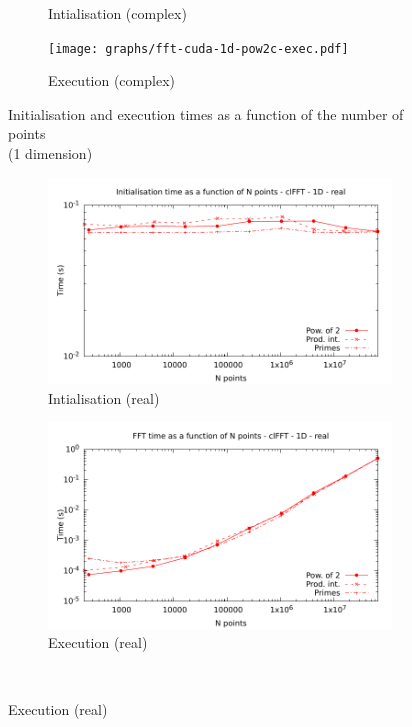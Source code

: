 \documentclass[12pt, a4paper]{article}
\begin{document}
\begin{figure}[H]
\begin{subfigure}{.5\textwidth}
\caption{Intialisation (complex)}
\label{FFTCUDA1DCI}
\end{subfigure}%
\begin{subfigure}{.5\textwidth}
\centering
\texttt{[image: graphs/fft-cuda-1d-pow2c-exec.pdf]}
\caption{Execution (complex)}
\label{FFTCUDA1DCE}
\end{subfigure}
\caption{Initialisation and execution times as a function of the number of points\\(1 dimension)}
\label{FFTCUDA1D}
\end{figure}


\begin{figure}[H]
\captionsetup{width=0.8\linewidth}
\centering
\begin{subfigure}{.5\textwidth}
\centering
\includegraphics[width=.9\linewidth]{graphs/fft-opencl-1d-pow2-r-init.pdf}
\caption{Intialisation (real)}
\label{FFTCL1DRI}
\end{subfigure}%
\begin{subfigure}{.5\textwidth}
\centering
\includegraphics[width=.9\linewidth]{graphs/fft-opencl-1d-pow2-r-exec.pdf}
\caption{Execution (real)}
\label{FFTCL1DRE}
\end{subfigure}\\

\end{figure}
\end{document}
